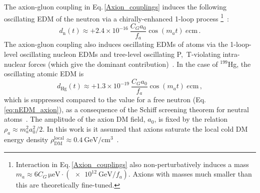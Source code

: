 The axion-gluon coupling in Eq.\,\ref{Axion_couplings} induces the following oscillating EDM of the neutron via a chirally-enhanced 1-loop process
\footnote{Interaction in Eq.\,\ref{Axion_couplings} also non-perturbatively induces a mass $m_a \approx 6 C_G\,\si{\micro\electronvolt} \cdot (\SI{e12}{\giga\electronvolt} / f_a)$.
Axions with masses much smaller than this are theoretically fine-tuned.}~\cite{Witten1979,Witten1979B,Pospelov1999}:
\begin{equation}
\label{eq:nEDM_axion}
d_\mathrm{n}(t) \approx +2.4 \times 10^{-16} ~ \frac{C_G a_0}{f_a} \cos(m_a t) ~ \si{\elementarycharge\centi\metre} \, .
\end{equation}
The axion-gluon coupling also induces oscillating EDMs of atoms via the 1-loop-level oscillating nucleon EDMs and tree-level oscillating P,~T-violating intra-nuclear forces (which give the dominant contribution)~\cite{Stadnik2014A,Flambaum1984EDM,Flambaum1984EDMB}.
In the case of $^{199}$Hg, the oscillating atomic EDM is~\cite{Stadnik2014A,StadnikThesis,Flambaum1985EDM,Flambaum1985EDMB,Flambaum2002EDM,Dmitriev2003A,Dmitriev2003B,Dmitriev2005,Engel2005,Engel2010}
\begin{equation}
\label{199Hg-EDM_axion}
d_{\textrm{Hg}}(t) \approx +1.3 \times 10^{-19} ~ \frac{C_G a_0}{f_a} \cos(m_a t) ~ \si{\elementarycharge\centi\metre} \, ,
\end{equation}
which is suppressed compared to the value for a free neutron (Eq.\,\ref{eq:nEDM_axion}), as a consequence of the Schiff screening theorem for neutral atoms~\cite{Schiff1963}.
The amplitude of the axion DM field, $a_0$, is fixed by the relation $\rho_a \approx m_a^2 a_0^2 /2$.
In this work is it assumed that axions saturate the local cold DM energy density $\rho_{\mathrm{DM}}^{\mathrm{local}} \approx \SI[per-mode=symbol]{0.4}{\giga\electronvolt\per\centi\metre\cubed}$~\cite{Catena2010}.

